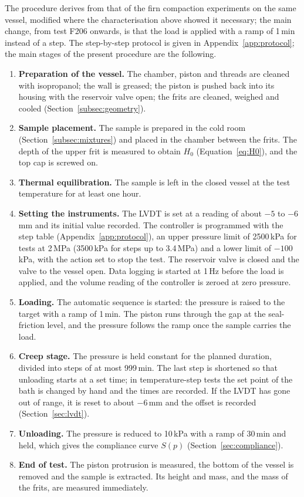 The procedure derives from that of the firn compaction experiments on the same vessel, modified where the characterisation above showed it necessary; the main change, from test F206 onwards, is that the load is applied with a ramp of 1\,min instead of a step. The step-by-step protocol is given in Appendix~\ref{app:protocol}; the main stages of the present procedure are the following.

\begin{enumerate}
    \item \textbf{Preparation of the vessel.} The chamber, piston and threads are cleaned with isopropanol; the wall is greased; the piston is pushed back into its housing with the reservoir valve open; the frits are cleaned, weighed and cooled (Section~\ref{subsec:geometry}).
    \item \textbf{Sample placement.} The sample is prepared in the cold room (Section~\ref{subsec:mixtures}) and placed in the chamber between the frits. The depth of the upper frit is measured to obtain $H_0$ (Equation~\eqref{eq:H0}), and the top cap is screwed on.
    \item \textbf{Thermal equilibration.} The sample is left in the closed vessel at the test temperature for at least one hour.
    \item \textbf{Setting the instruments.} The LVDT is set at a reading of about $-5$ to $-6$\,mm and its initial value recorded. The controller is programmed with the step table (Appendix~\ref{app:protocol}), an upper pressure limit of 2500\,kPa for tests at 2\,MPa (3500\,kPa for steps up to 3.4\,MPa) and a lower limit of $-100$\,kPa, with the action set to stop the test. The reservoir valve is closed and the valve to the vessel open. Data logging is started at 1\,Hz before the load is applied, and the volume reading of the controller is zeroed at zero pressure.
    \item \textbf{Loading.} The automatic sequence is started: the pressure is raised to the target with a ramp of 1\,min. The piston runs through the gap at the seal-friction level, and the pressure follows the ramp once the sample carries the load.
    \item \textbf{Creep stage.} The pressure is held constant for the planned duration, divided into steps of at most 999\,min. The last step is shortened so that unloading starts at a set time; in temperature-step tests the set point of the bath is changed by hand and the times are recorded. If the LVDT has gone out of range, it is reset to about $-6$\,mm and the offset is recorded (Section~\ref{sec:lvdt}).
    \item \textbf{Unloading.} The pressure is reduced to 10\,kPa with a ramp of 30\,min and held, which gives the compliance curve $S(p)$ (Section~\ref{sec:compliance}).
    \item \textbf{End of test.} The piston protrusion is measured, the bottom of the vessel is removed and the sample is extracted. Its height and mass, and the mass of the frits, are measured immediately.
\end{enumerate}

